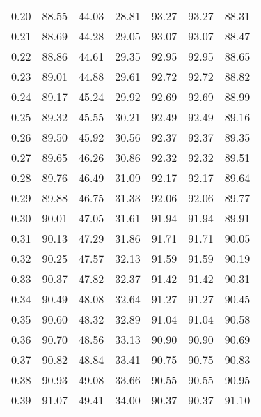 \begin{tabular}{|c|c|c|c|c|c|c|}
      0.20 &     88.55 &     44.03 &      28.81 &   93.27 &      93.27 &         88.31 \\
      0.21 &     88.69 &     44.28 &      29.05 &   93.07 &      93.07 &         88.47 \\
      0.22 &     88.86 &     44.61 &      29.35 &   92.95 &      92.95 &         88.65 \\
      0.23 &     89.01 &     44.88 &      29.61 &   92.72 &      92.72 &         88.82 \\
      0.24 &     89.17 &     45.24 &      29.92 &   92.69 &      92.69 &         88.99 \\
      0.25 &     89.32 &     45.55 &      30.21 &   92.49 &      92.49 &         89.16 \\
      0.26 &     89.50 &     45.92 &      30.56 &   92.37 &      92.37 &         89.35 \\
      0.27 &     89.65 &     46.26 &      30.86 &   92.32 &      92.32 &         89.51 \\
      0.28 &     89.76 &     46.49 &      31.09 &   92.17 &      92.17 &         89.64 \\
      0.29 &     89.88 &     46.75 &      31.33 &   92.06 &      92.06 &         89.77 \\
      0.30 &     90.01 &     47.05 &      31.61 &   91.94 &      91.94 &         89.91 \\
      0.31 &     90.13 &     47.29 &      31.86 &   91.71 &      91.71 &         90.05 \\
      0.32 &     90.25 &     47.57 &      32.13 &   91.59 &      91.59 &         90.19 \\
      0.33 &     90.37 &     47.82 &      32.37 &   91.42 &      91.42 &         90.31 \\
      0.34 &     90.49 &     48.08 &      32.64 &   91.27 &      91.27 &         90.45 \\
      0.35 &     90.60 &     48.32 &      32.89 &   91.04 &      91.04 &         90.58 \\
      0.36 &     90.70 &     48.56 &      33.13 &   90.90 &      90.90 &         90.69 \\
      0.37 &     90.82 &     48.84 &      33.41 &   90.75 &      90.75 &         90.83 \\
      0.38 &     90.93 &     49.08 &      33.66 &   90.55 &      90.55 &         90.95 \\
      0.39 &     91.07 &     49.41 &      34.00 &   90.37 &      90.37 &         91.10 \\

\end{tabular}
